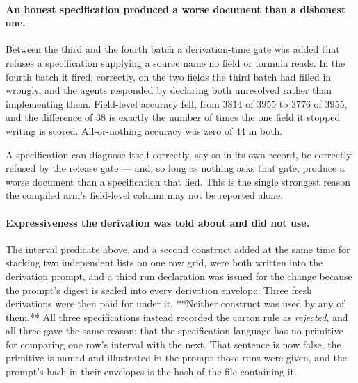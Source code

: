\paragraph{An honest specification produced a worse document than a dishonest one.}
Between the third and the fourth batch a derivation-time gate was added that refuses a
specification supplying a source name no field or formula reads. In the fourth batch it fired,
correctly, on the two fields the third batch had filled in wrongly, and the agents responded by
declaring both unresolved rather than implementing them. Field-level accuracy fell, from
$3814$ of $3955$ to $3776$ of $3955$, and the difference of $38$ is exactly the number of times
the one field it stopped writing is scored. All-or-nothing accuracy was zero of $44$ in both.

A specification can diagnose itself correctly, say so in its own record, be correctly refused by
the release gate --- and, so long as nothing asks that gate, produce a worse document than a
specification that lied. This is the single strongest reason the compiled arm's field-level
column may not be reported alone.

\paragraph{Expressiveness the derivation was told about and did not use.}
The interval predicate above, and a second construct added at the same time for stacking two
independent lists on one row grid, were both written into the derivation prompt, and a third
run declaration was issued for the change because the prompt's digest is sealed into every
derivation envelope. Three fresh derivations were then paid for under it. **Neither construct
was used by any of them.** All three specifications instead recorded the carton rule as
\emph{rejected}, and all three gave the same reason: that the specification language has no
primitive for comparing one row's interval with the next. That sentence is now false, the
primitive is named and illustrated in the prompt those runs were given, and the prompt's hash in
their envelopes is the hash of the file containing it.

